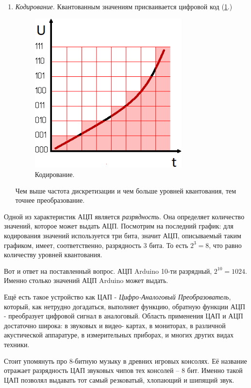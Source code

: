 \documentclass[a4paper,twoside]{book}
\begin{document}
\begin{enumerate}
\item \emph{Кодирование.} Квантованным значениям присваивается цифровой код
  (\ref{fig:coding}.)

  \begin{figure}[h]
    \caption{Кодирование.}
    \label{fig:coding}
    \includegraphics[width=8cm]{coding}
    \centering
  \end{figure}

  Чем выше частота дискретизации и чем больше уровней квантования, тем точнее
  преобразование.

\end{enumerate}

Одной из характеристик АЦП является \emph{разрядность}. Она определяет
количество значений, которое может выдать АЦП. Посмотрим на последний график:
для кодирования значений используется три бита, значит АЦП, описываемый таким
графиком, имеет, соответственно, разрядность 3 бита. То есть $ 2^3 = 8 $, что
равно количеству уровней квантования.

Вот и ответ на поставленный вопрос. АЦП Arduino 10-ти разрядный, $2^10 = 1024$.
Именно столько значений АЦП Arduino может выдать.

Ещё есть такое устройство как ЦАП - \emph{Цифро-Аналоговый Преобразователь},
который, как нетрудно догадаться, выполняет функцию, обратную функции АЦП -
преобразует цифровой сигнал в аналоговый. Область применения ЦАП и АЦП
достаточно широка: в звуковых и видео- картах, в мониторах, в различной
акустической аппаратуре, в измерительных приборах, и многих других видах
техники.

Стоит упомянуть про 8-битную музыку в древних игровых консолях. Её название
отражает разрядность ЦАП звуковых чипов тех консолей -- 8 бит. Именно такой ЦАП
позволял выдавать тот самый резковатый, хлопающий и шипящий звук.
\end{document}

